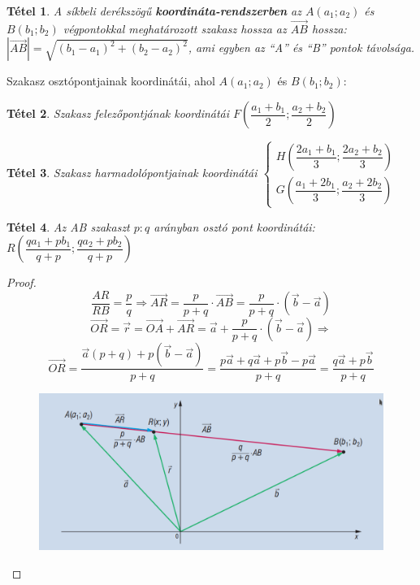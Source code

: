 \documentclass[12pt,a4paper]{article}
\newtheorem{theorem}{Tétel} [section]
\begin{document}
\begin{theorem}
A síkbeli derékszögű \textbf{koordináta-rendszerben} az $A(a_1;a_2)$ és $B(b_1;b_2)$ végpontokkal meghatározott szakasz hossza az $\overrightarrow{AB}$ hossza: $|\overrightarrow{AB}|=\sqrt{(b_1-a_1)^2+(b_2-a_2)^2}$, ami egyben az ``A'' és ``B'' pontok távolsága.
\end{theorem}

Szakasz osztópontjainak koordinátái, ahol $A(a_1;a_2)$ és $B(b_1;b_2)$:

\begin{theorem}
Szakasz felezőpontjának koordinátái $F\left(\dfrac{a_1+b_1}{2};\dfrac{a_2+b_2}{2} \right)$
\end{theorem}

\begin{theorem}
Szakasz harmadolópontjainak koordinátái $\begin{cases}H\left(\dfrac{2a_1+b_1}{3};\dfrac{2a_2+b_2}{3} \right) \\ G\left(\dfrac{a_1+2b_1}{3};\dfrac{a_2+2b_2}{3} \right)  \end{cases}$
\end{theorem}

\begin{theorem}
Az AB szakaszt $p : q$ arányban osztó pont koordinátái: $R\left(\dfrac{qa_1+pb_1}{q+p}; \dfrac{qa_2+pb_2}{q+p} \right)$
\end{theorem}
\begin{proof}
\[\dfrac{AR}{RB}=\dfrac{p}{q}\Rightarrow \overrightarrow{AR}=\dfrac{p}{p+q}\cdot \overrightarrow{AB}=\dfrac{p}{p+q}\cdot (\vec{b}-\vec{a})\]
\[\overrightarrow{OR}=\vec{r}=\overrightarrow{OA}+\overrightarrow{AR}=\vec{a}+\dfrac{p}{p+q}\cdot (\vec{b}-\vec{a})\Rightarrow\]
\[\overrightarrow{OR}=\dfrac{\vec{a}(p+q)+p(\vec{b}-\vec{a})}{p+q}=\dfrac{p\vec{a}+q\vec{a}+p\vec{b}-p\vec{a}}{p+q}=\dfrac{q\vec{a}+p\vec{b}}{p+q}\]
\begin{figure}[h!]
\centering
\includegraphics[scale=0.3]{img/osztopont}
\end{figure}
\end{proof}
\end{document}
